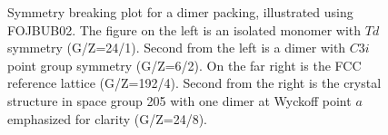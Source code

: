 \documentclass[preprint]{iucr}              %
\begin{document}
\begin{figure}
\caption{Symmetry breaking plot for a dimer packing, illustrated using FOJBUB02.  The figure on the left is an isolated monomer with $Td$ symmetry (G/Z=24/1).  Second from the left is a dimer with $C3i$ point group symmetry (G/Z=6/2).  On the far right is the FCC reference lattice (G/Z=192/4).  Second from the right is the crystal structure in space group 205 with one dimer at Wyckoff point $a$ emphasized for clarity (G/Z=24/8).}
\label{fig_FOJBUB02}
\end{figure}
\end{document}
